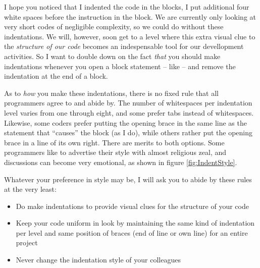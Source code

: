 \begin{hintbox}
I hope you noticed that I indented the code in the  blocks, \ie I put additional four white spaces before the instruction in the  block. We are currently only looking at very short codes of negligible complexity, so we could do without these indentations. We will, however, soon get to a level where this extra visual clue to the \emph{structure of our code} becomes an indespensable tool for our devellopment activities. So I want to double down on the fact \emph{that} you should make indentations whenever you open a block statement -- like  -- and remove the indentation at the end of a block.

As to \emph{how} you make these indentations, there is no fixed rule that all programmers agree to and abide by. The number of whitespaces per indentation level varies from one through eight, and some prefer tabs instead of whitespaces. Likewise, some coders prefer putting the opening brace in the same line as the statement that \enquote{causes} the block (as I do), while others rather put the opening brace in a line of its own right. There are merits to both options. Some programmers like to advertise their style with almost religious zeal, and discussions can become very emotional, as shown in figure \ref{fig:IndentStyle}.

Whatever your preference in style may be, I will ask you to abide by these rules at the very least:
\begin{itemize}
\item Do make indentations to provide visual clues for the structure of your code
\item Keep your code uniform in look by maintaining the same kind of indentation per level and same position of braces (end of line or own line) for an entire project
\item Never change the indentation style of your colleagues
\end{itemize}
\end{hintbox}

